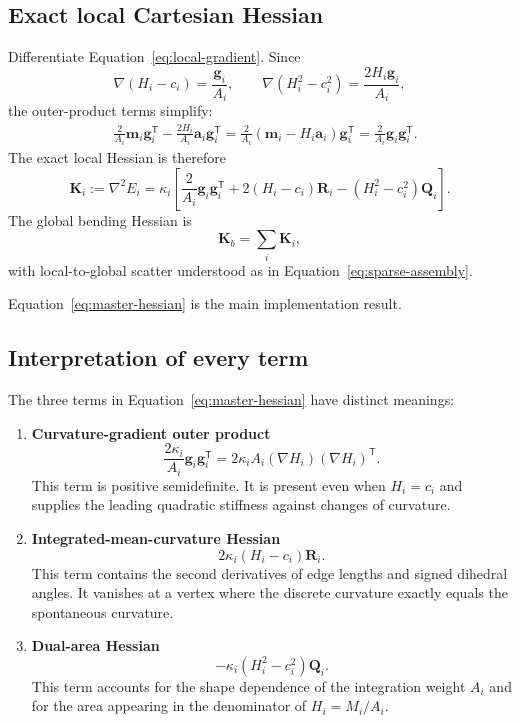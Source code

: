 \documentclass[11pt]{article}
\newcommand{\T}{\mathsf{T}}
\newcommand{\grad}{\nabla}
\newcommand{\Hess}{\nabla^2}
\newcommand{\aV}{\mathbf{a}}
\newcommand{\mV}{\mathbf{m}}
\newcommand{\gV}{\mathbf{g}}
\newcommand{\Q}{\mathbf{Q}}
\newcommand{\Mmat}{\mathbf{R}}
\newcommand{\Kmat}{\mathbf{K}}
\begin{document}
\subsection{Exact local Cartesian Hessian}

Differentiate Equation~\eqref{eq:local-gradient}.  Since
\begin{equation}
  \grad(H_i-c_i)=\frac{\gV_i}{A_i},
  \qquad
  \grad(H_i^2-c_i^2)=\frac{2H_i\gV_i}{A_i},
\end{equation}
the outer-product terms simplify:
\begin{align}
  &\frac{2}{A_i}\mV_i\gV_i^\T
  -\frac{2H_i}{A_i}\aV_i\gV_i^\T
  =\frac{2}{A_i}(\mV_i-H_i\aV_i)\gV_i^\T
  =\frac{2}{A_i}\gV_i\gV_i^\T.
\end{align}
The exact local Hessian is therefore
\begin{equation}
  \boxed{
  \Kmat_i
  :=\Hess E_i
  =
  \kappa_i\left[
    \frac{2}{A_i}\gV_i\gV_i^\T
    +2(H_i-c_i)\Mmat_i
    -(H_i^2-c_i^2)\Q_i
  \right].}
  \label{eq:master-hessian}
\end{equation}
The global bending Hessian is
\begin{equation}
  \boxed{
  \Kmat_b=\sum_i\Kmat_i,}
  \label{eq:global-hessian}
\end{equation}
with local-to-global scatter understood as in Equation~\eqref{eq:sparse-assembly}.

Equation~\eqref{eq:master-hessian} is the main implementation result.

\subsection{Interpretation of every term}

The three terms in Equation~\eqref{eq:master-hessian} have distinct meanings:
\begin{enumerate}
  \item \textbf{Curvature-gradient outer product}
  \begin{equation}
    \frac{2\kappa_i}{A_i}\gV_i\gV_i^\T
    =2\kappa_i A_i(\grad H_i)(\grad H_i)^\T.
  \end{equation}
  This term is positive semidefinite.  It is present even when $H_i=c_i$ and supplies the leading quadratic stiffness against changes of curvature.

  \item \textbf{Integrated-mean-curvature Hessian}
  \begin{equation}
    2\kappa_i(H_i-c_i)\Mmat_i.
  \end{equation}
  This term contains the second derivatives of edge lengths and signed dihedral angles.  It vanishes at a vertex where the discrete curvature exactly equals the spontaneous curvature.

  \item \textbf{Dual-area Hessian}
  \begin{equation}
    -\kappa_i(H_i^2-c_i^2)\Q_i.
  \end{equation}
  This term accounts for the shape dependence of the integration weight $A_i$ and for the area appearing in the denominator of $H_i=M_i/A_i$.
\end{enumerate}
\end{document}
